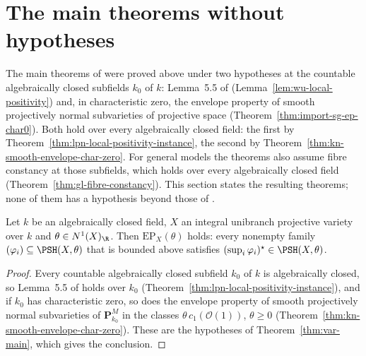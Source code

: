 \section{The main theorems without hypotheses}
\label{sec:main-fully-unconditional}

The main theorems of \cite{FHX} were proved above under two hypotheses at the
countable algebraically closed subfields $k_0$ of $k$: Lemma~5.5 of \cite{FHX}
(Lemma~\ref{lem:wu-local-positivity}) and, in characteristic zero, the envelope
property of smooth projectively normal subvarieties of projective space
(Theorem~\ref{thm:import-sg-ep-char0}). Both hold over every algebraically
closed field: the first by Theorem~\ref{thm:lpn-local-positivity-instance}, the
second by Theorem~\ref{thm:kn-smooth-envelope-char-zero}. For general models
the theorems also assume fibre constancy at those subfields, which holds over
every algebraically closed field (Theorem~\ref{thm:gl-fibre-constancy}). This
section states the resulting theorems; none of them has a hypothesis beyond
those of \cite{FHX}.

\begin{theorem}
\label{thm:fu-variety-main}
\leanok
Let $k$ be an algebraically closed field, $X$ an integral unibranch projective
variety over $k$ and $\theta\in N^1(X)_\R$. Then $\mathrm{EP}_X(\theta)$ holds:
every nonempty family $(\varphi_i)\subseteq\PSH(X,\theta)$ that is bounded above
satisfies $(\sup_i\varphi_i)^\star\in\PSH(X,\theta)$.
\end{theorem}
\begin{proof}
Every countable algebraically closed subfield $k_0$ of $k$ is algebraically
closed, so Lemma~5.5 of \cite{FHX} holds over $k_0$
(Theorem~\ref{thm:lpn-local-positivity-instance}), and if $k_0$ has
characteristic zero, so does the envelope property of smooth projectively normal
subvarieties of $\mathbf P^M_{k_0}$ in the classes $\theta\,c_1(\mathcal O(1))$,
$\theta\geq0$ (Theorem~\ref{thm:kn-smooth-envelope-char-zero}). These are the
hypotheses of Theorem~\ref{thm:var-main}, which gives the conclusion.
\end{proof}

